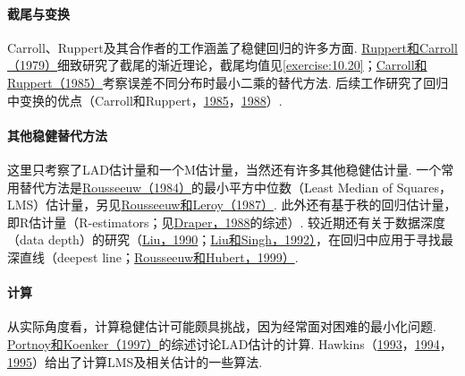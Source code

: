 \paragraph{截尾与变换}
Carroll、Ruppert及其合作者的工作涵盖了稳健回归的许多方面. \hyperref[bib:source269]{Ruppert和Carroll（1979）}细致研究了截尾的渐近理论，截尾均值见\autoref{exercise:10.20}；\hyperref[bib:source60]{Carroll和Ruppert（1985）}考察误差不同分布时最小二乘的替代方法. 后续工作研究了回归中变换的优点（Carroll和Ruppert，\hyperref[bib:source60]{1985}，\hyperref[bib:source61]{1988}）.

\paragraph{其他稳健替代方法}
这里只考察了LAD估计量和一个M估计量，当然还有许多其他稳健估计量. 一个常用替代方法是\hyperref[bib:source262]{Rousseeuw（1984）}的最小平方中位数（Least Median of Squares，LMS）估计量，另见\hyperref[bib:source264]{Rousseeuw和Leroy（1987）}. 此外还有基于秩的回归估计量，即R估计量（R-estimators；见\hyperref[bib:source101]{Draper，1988}的综述）. 较近期还有关于数据深度（data depth）的研究（\hyperref[bib:source209]{Liu，1990}；\hyperref[bib:source210]{Liu和Singh，1992）}，在回归中应用于寻找最深直线（deepest line；\hyperref[bib:source263]{Rousseeuw和Hubert，1999）}.

\paragraph{计算}
从实际角度看，计算稳健估计可能颇具挑战，因为经常面对困难的最小化问题. \hyperref[bib:source244]{Portnoy和Koenker（1997）}的综述讨论LAD估计的计算. Hawkins（\hyperref[bib:source161]{1993}，\hyperref[bib:source162]{1994}，\hyperref[bib:source163]{1995}）给出了计算LMS及相关估计的一些算法.
